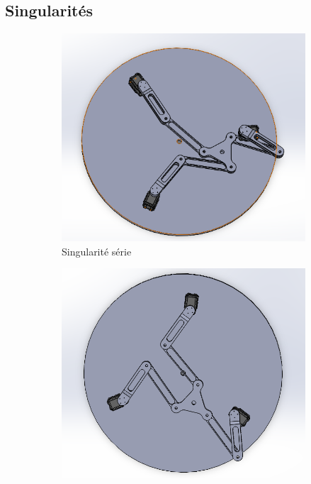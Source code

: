 \documentclass[a4paper, 11pt]{report}
\begin{document}
\subsection{Singularités}

\begin{figure}[!tbh]
    \centering
    \begin{subfigure}[t]{0.48\textwidth}
        \centering
        \includegraphics[width=\textwidth]{Figures/singularité série.png}
        \caption{Singularité série}
    \end{subfigure}
    \hfill
    \begin{subfigure}[t]{0.48\textwidth}
        \centering
        \includegraphics[width=\textwidth]{Figures/singularité parallèle.png}

\end{subfigure}
\end{figure}
\end{document}
